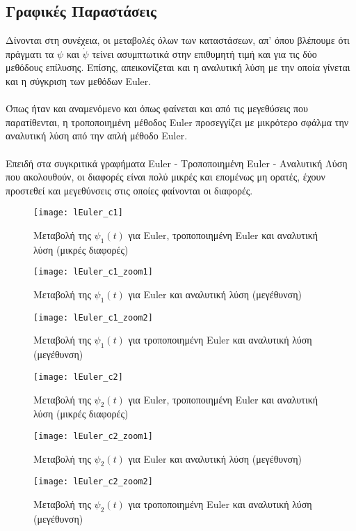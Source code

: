 \documentclass{article}
\begin{document}
\subsection{Γραφικές Παραστάσεις}
Δίνονται στη συνέχεια, οι μεταβολές όλων των καταστάσεων, απ' όπου βλέπουμε ότι πράγματι τα \(\psi\) και \(\dot{\psi}\) τείνει ασυμπτωτικά στην επιθυμητή τιμή και για τις δύο μεθόδους επίλυσης. Επίσης, απεικονίζεται και η αναλυτική λύση με την οποία γίνεται και η σύγκριση των μεθόδων Euler.
\\\\Όπως ήταν και αναμενόμενο και όπως φαίνεται και από τις μεγεθύσεις που παρατίθενται, η τροποποιημένη μέθοδος Euler προσεγγίζει με μικρότερο σφάλμα την αναλυτική λύση από την απλή μέθοδο Euler.
\\\\
Επειδή στα συγκριτικά γραφήματα Euler - Tροποποιημένη Euler - Αναλυτική Λύση που ακολουθούν, οι διαφορές είναι πολύ μικρές και επομένως μη ορατές, έχουν προστεθεί και μεγεθύνσεις στις οποίες φαίνονται οι διαφορές.

\clearpage

\begin{figure}[bh!]
 \centering
\texttt{[image: lEuler\_c1]}
\caption{Μεταβολή της $\psi_1(t)$ για Euler, τροποποιημένη
 Euler και αναλυτική λύση (μικρές διαφορές)}
\end{figure}
 \clearpage
 
\begin{figure}[h!]
 \centering
\texttt{[image: lEuler\_c1\_zoom1]}
\caption{Μεταβολή της $\psi_1(t)$ για Euler και αναλυτική λύση (μεγέθυνση)}
\end{figure}

\begin{figure}[h!]
 \centering
\texttt{[image: lEuler\_c1\_zoom2]}
\caption{Μεταβολή της $\psi_1(t)$ για τροποποιημένη Euler και αναλυτική λύση (μεγέθυνση)}
\end{figure}
 \clearpage
 
 \begin{figure}[bh!]
 \centering
\texttt{[image: lEuler\_c2]}
\caption{Μεταβολή της $\psi_2(t)$ για Euler, τροποποιημένη
 Euler και αναλυτική λύση (μικρές διαφορές)}
\end{figure}
 \clearpage
 
\begin{figure}[h!]
 \centering
\texttt{[image: lEuler\_c2\_zoom1]}
\caption{Μεταβολή της $\psi_2(t)$ για Euler και αναλυτική λύση (μεγέθυνση)}
\end{figure}

\begin{figure}[h!]
 \centering
\texttt{[image: lEuler\_c2\_zoom2]}
\caption{Μεταβολή της $\psi_2(t)$ για τροποποιημένη Euler και αναλυτική λύση (μεγέθυνση)}
\end{figure}
 \clearpage
\end{document}
